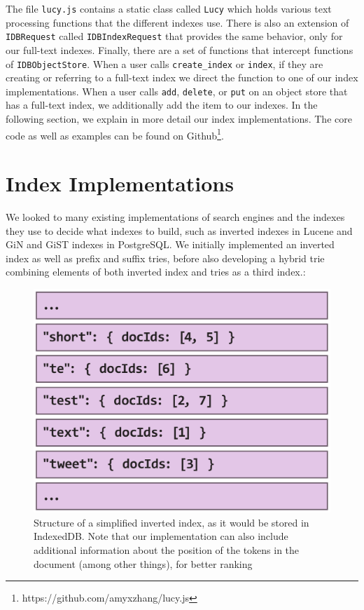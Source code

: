 \documentclass{vldb}
\begin{document}
The file \texttt{lucy.js} contains a static class called \texttt{Lucy} which holds various text processing functions that the different indexes use. There is also an extension of \texttt{IDBRequest} called \texttt{IDBIndexRequest} that provides the same behavior, only for our full-text indexes. Finally, there are a set of functions that intercept functions of \texttt{IDBObjectStore}. When a user calls \texttt{create\_index} or \texttt{index}, if they are creating or referring to a full-text index we direct the function to one of our index implementations. When a user calls \texttt{add},  \texttt{delete}, or \texttt{put} on an object store that has a full-text index, we additionally add the item to our indexes. In the following section, we explain in more detail our index implementations.
The core code as well as examples can be found on Github\footnote{https://github.com/amyxzhang/lucy.js}.


\section{Index Implementations}

We looked to many existing implementations of search engines and the indexes they use to decide what indexes to build, such as inverted indexes in Lucene and GiN and GiST indexes in PostgreSQL. We initially implemented an inverted index as well as prefix and suffix tries, before also developing a hybrid trie combining elements of both inverted index and tries as a third index.:

\begin{figure}
  \centering
   \includegraphics[scale=.35]{inverted-index}
  \caption{Structure of a simplified inverted index, as it would be stored in IndexedDB. Note that our implementation can also include additional information about the position of the tokens in the document (among other things), for better ranking}
\label{invindex}
\end{figure}
\end{document}

